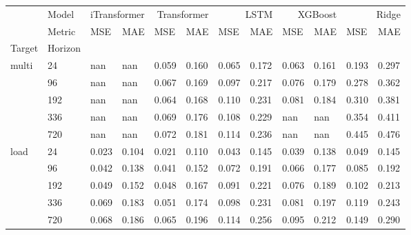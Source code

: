 \begin{tabular}{llllllllllll}
\toprule
 & Model & \multicolumn{2}{r}{iTransformer} & \multicolumn{2}{r}{Transformer} & \multicolumn{2}{r}{LSTM} & \multicolumn{2}{r}{XGBoost} & \multicolumn{2}{r}{Ridge} \\
 & Metric & MSE & MAE & MSE & MAE & MSE & MAE & MSE & MAE & MSE & MAE \\
Target & Horizon &  &  &  &  &  &  &  &  &  &  \\
\midrule
\multirow[t]{5}{*}{multi} & 24 & nan & nan & 0.059 & 0.160 & 0.065 & 0.172 & 0.063 & 0.161 & 0.193 & 0.297 \\
 & 96 & nan & nan & 0.067 & 0.169 & 0.097 & 0.217 & 0.076 & 0.179 & 0.278 & 0.362 \\
 & 192 & nan & nan & 0.064 & 0.168 & 0.110 & 0.231 & 0.081 & 0.184 & 0.310 & 0.381 \\
 & 336 & nan & nan & 0.069 & 0.176 & 0.108 & 0.229 & nan & nan & 0.354 & 0.411 \\
 & 720 & nan & nan & 0.072 & 0.181 & 0.114 & 0.236 & nan & nan & 0.445 & 0.476 \\
\cline{1-12}
\multirow[t]{5}{*}{load} & 24 & 0.023 & 0.104 & 0.021 & 0.110 & 0.043 & 0.145 & 0.039 & 0.138 & 0.049 & 0.145 \\
 & 96 & 0.042 & 0.138 & 0.041 & 0.152 & 0.072 & 0.191 & 0.066 & 0.177 & 0.085 & 0.192 \\
 & 192 & 0.049 & 0.152 & 0.048 & 0.167 & 0.091 & 0.221 & 0.076 & 0.189 & 0.102 & 0.213 \\
 & 336 & 0.069 & 0.183 & 0.051 & 0.174 & 0.098 & 0.231 & 0.081 & 0.197 & 0.119 & 0.243 \\
 & 720 & 0.068 & 0.186 & 0.065 & 0.196 & 0.114 & 0.256 & 0.095 & 0.212 & 0.149 & 0.290 \\
\cline{1-12}
\bottomrule
\end{tabular}
